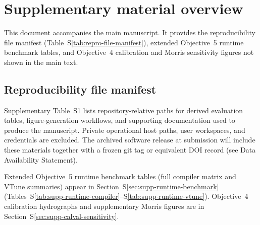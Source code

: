 \section{Supplementary material overview}
\label{app:supplementary}

This document accompanies the main manuscript.
It provides the reproducibility file manifest (Table~S\ref{tab:repro-file-manifest}), extended Objective~5 runtime benchmark tables, and Objective~4 calibration and Morris sensitivity figures not shown in the main text.

\subsection{Reproducibility file manifest}
\label{sec:supp-repro-manifest}

Supplementary Table~S1 lists repository-relative paths for derived evaluation tables, figure-generation workflows, and supporting documentation used to produce the manuscript.
Private operational host paths, user workspaces, and credentials are excluded.
The archived software release at submission will include these materials together with a frozen git tag or equivalent DOI record (see Data Availability Statement).

Extended Objective~5 runtime benchmark tables (full compiler matrix and VTune summaries) appear in Section~S\ref{sec:supp-runtime-benchmark} (Tables~S\ref{tab:supp-runtime-compiler}--S\ref{tab:supp-runtime-vtune}).
Objective~4 calibration hydrographs and supplementary Morris figures are in Section~S\ref{sec:supp-calval-sensitivity}.

{\small
\setlength{\tabcolsep}{4pt}
\setlength{\LTleft}{0pt}
\setlength{\LTright}{0pt}
\setlength{\LTcapwidth}{\textwidth}
\renewcommand{\arraystretch}{1.15}
%
}

\clearpage
